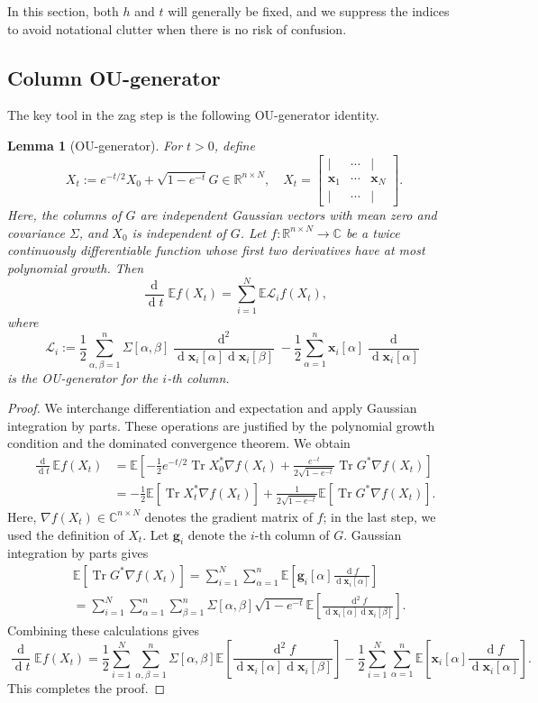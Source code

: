 \documentclass[11pt,reqno]{amsart}
\def\R{\mathbb{R}}
\def\g{\mathbf{g}}
\def\x{\mathbf{x}}
\def\C{\mathbb{C}}
\def\E{\mathbb{E}}
\def\cL{\mathcal{L}}
\def\de{\operatorname{d}}
\def\Tr{\operatorname{Tr}}
\newtheorem{lemma}[theorem]{Lemma}
\theoremstyle{definition}
\numberwithin{equation}{section}
\numberwithin{figure}{section}
\begin{document}
In this section, both $h$ and $t$ will generally be fixed, and we suppress the indices to avoid notational clutter when there is no risk of confusion.

\subsection{Column OU-generator}
The key tool in the zag step is the following OU-generator identity.
\begin{lemma}[OU-generator]\label{lem:OU-generator}
For $t> 0$, define
\[
    X_t:=e^{-t/2}X_0+\sqrt{1-e^{-t}}G\in\R^{n\times N},\quad X_t=\begin{bmatrix}
        | & \cdots &|\\
        \x_1 & \cdots & \x_N\\
        | & \cdots & |
    \end{bmatrix}.
\]
Here, the columns of $G$ are independent Gaussian vectors with mean zero and covariance $\Sigma$, and $X_0$ is independent of $G$. Let $f:\R^{n\times N}\rightarrow\C$ be a twice continuously differentiable function whose first two derivatives have at most polynomial growth. Then
\[
    \frac{\de }{\de t}\E f(X_t)=\sum_{i=1}^N\E\cL_if(X_t),
\]
where
\[
    \cL_i:=\frac{1}{2}\sum_{\alpha,\beta=1}^n\Sigma[\alpha,\beta]\frac{\de^2}{\de\x_i[\alpha]\de\x_i[\beta]}-\frac{1}{2}\sum_{\alpha=1}^n\x_i[\alpha]\frac{\de}{\de\x_i[\alpha]}
\]
is the OU-generator for the $i$-th column.
\end{lemma}
\begin{proof}
We interchange differentiation and expectation and apply Gaussian integration by parts. These operations are justified by the polynomial growth condition and the dominated convergence theorem. We obtain
\begin{align*}
    \frac{\de}{\de t}\E f(X_t)&=\E\left[-\frac{1}{2}e^{-t/2}\Tr X_0^*\nabla f(X_t)+\frac{e^{-t}}{2\sqrt{1-e^{-t}}}\Tr G^*\nabla f(X_t)\right]\\
    &=-\frac{1}{2}\E\left[\Tr X_t^*\nabla f(X_t)\right]+\frac{1}{2\sqrt{1-e^{-t}}}\E\left[\Tr G^*\nabla f(X_t)\right] . 
\end{align*}
Here, $\nabla f(X_t)\in\C^{n\times N}$ denotes the gradient matrix of $f$; in the last step, we used the definition of $X_t$. Let $\g_i$ denote the $i$-th column of $G$. Gaussian integration by parts gives
\begin{align*}
    &\E[\Tr G^*\nabla f(X_t)]=\sum_{i=1}^N\sum_{\alpha=1}^n\E\left[\g_i[\alpha]\frac{\de f}{\de\x_i[\alpha]}\right]\\
    &=\sum_{i=1}^N\sum_{\alpha=1}^n\sum_{\beta=1}^n\Sigma[\alpha,\beta]\sqrt{1-e^{-t}}\E\left[\frac{\de^2 f}{\de\x_i[\alpha]\de\x_i[\beta]}\right].
\end{align*}
Combining these calculations gives
\[
    \frac{\de}{\de t}\E f(X_t)=\frac{1}{2}\sum_{i=1}^N\sum_{\alpha,\beta=1}^n\Sigma[\alpha,\beta]\E\left[\frac{\de^2 f}{\de\x_i[\alpha]\de\x_i[\beta]}\right]-\frac{1}{2}\sum_{i=1}^N\sum_{\alpha=1}^n\E\left[\x_i[\alpha]\frac{\de f}{\de\x_i[\alpha]}\right].
\]
This completes the proof.
\end{proof}
\end{document}
